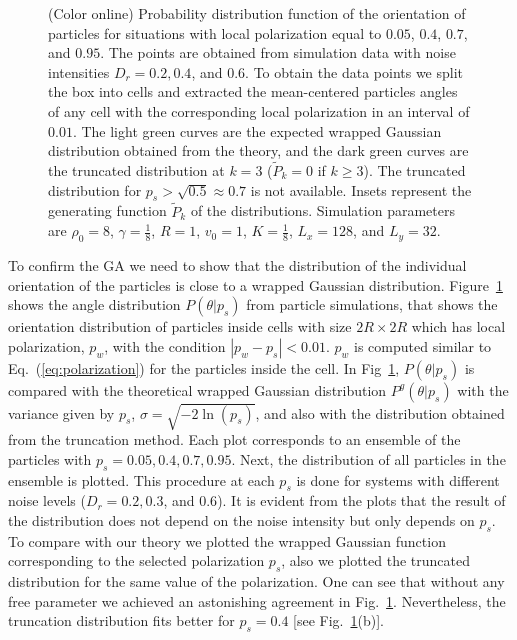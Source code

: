 \documentclass[reprint,floatfix,amsmath,amssymb,aps,pre,showkeys,showpacs,superscriptaddress]{revtex4-1}
\newcommand{\p}{p}
\newcommand{\hl}[1]{\textcolor{hlcolor}{#1}}
\newcommand{\req}[1]{Eq.~(\ref{#1})}
\begin{document}
\begin{figure}
\caption{(Color online) Probability distribution function of the orientation of particles for situations with local polarization equal to  $0.05$,  $0.4$,  $0.7$, and  $0.95$. The points are obtained from simulation data with noise intensities $D_r=0.2,0.4$, and $0.6$. To obtain the data points we split the box into cells and extracted the \hl{mean-centered particles angles} of any cell with the corresponding local polarization in an interval of $0.01$. The light green curves are the expected wrapped Gaussian distribution obtained from the theory, and the dark green curves are the truncated distribution at $k=3$ ($\tilde{P}_k = 0$ if $k \ge 3$). The truncated distribution for $p_s > \sqrt{0.5} \approx 0.7$ is not available. Insets represent the generating function $\tilde{P}_k$ of the distributions. Simulation parameters are $\rho_0=8$, $\gamma = \frac{1}{8}$, $R=1$, $v_0=1$, $K=\frac{1}{8}$, $L_x=128$, and $L_y=32$.}
	\label{fig:f-alignment-distribution}
\end{figure}

To \hl{confirm} the GA we need to show that the distribution of the individual orientation of the particles is close to a wrapped Gaussian distribution. Figure~\ref{fig:f-alignment-distribution} \hl{shows} the angle distribution $P(\theta|\p_s)$ from particle simulations\hl{, that shows the orientation distribution of particles inside cells with size $2R\times 2R$ which has local polarization, $\p_w$, with the condition $|\p_w - \p_s| < 0.01$. $\p_w$ is computed similar to \req{eq:polarization} for the particles inside the cell. In Fig~\ref{fig:f-alignment-distribution}, $P(\theta|\p_s)$ is compared} with the theoretical wrapped Gaussian distribution $P^g(\theta|\p_s)$ with \hl{the} variance given by $\p_s$, $\sigma= \sqrt{-2 \ln(\p_s)}$, and also with the distribution obtained from the truncation method. Each plot corresponds to an ensemble of the particles with $\p_s=0.05,0.4,0.7,0.95$. Next, the distribution of all particles in the ensemble is plotted. This procedure at each $\p_s$ is done for systems with different noise levels ($D_r=0.2,0.3$, and $0.6$). It is evident from the plots that the result of the distribution does not depend on the noise intensity but only depends on $\p_s$. To compare with \hl{our} theory we plotted the wrapped Gaussian function corresponding to the selected polarization $\p_s$, also we plotted the truncated distribution for the same value of \hl{the} polarization. One can see that without any free parameter we achieved an astonishing agreement in Fig.~\ref{fig:f-alignment-distribution}. Nevertheless, the truncation distribution fits better \hl{for} $\p_s=0.4$ [see Fig.~\ref{fig:f-alignment-distribution}(b)].
\end{document}
